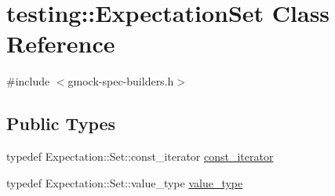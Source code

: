 \hypertarget{classtesting_1_1ExpectationSet}{}\section{testing\+:\+:Expectation\+Set Class Reference}
\label{classtesting_1_1ExpectationSet}


{\ttfamily \#include $<$gmock-\/spec-\/builders.\+h$>$}

\subsection*{Public Types}
\begin{DoxyCompactItemize}
\item 
typedef Expectation\+::\+Set\+::const\+\_\+iterator \hyperlink{classtesting_1_1ExpectationSet_ab269a45f80d8c4f747b29de454a084bb}{const\+\_\+iterator}
\item 
typedef Expectation\+::\+Set\+::value\+\_\+type \hyperlink{classtesting_1_1ExpectationSet_aab6d2d4800cec231bcedae33deaca7f6}{value\+\_\+type}
\end{DoxyCompactItemize}
